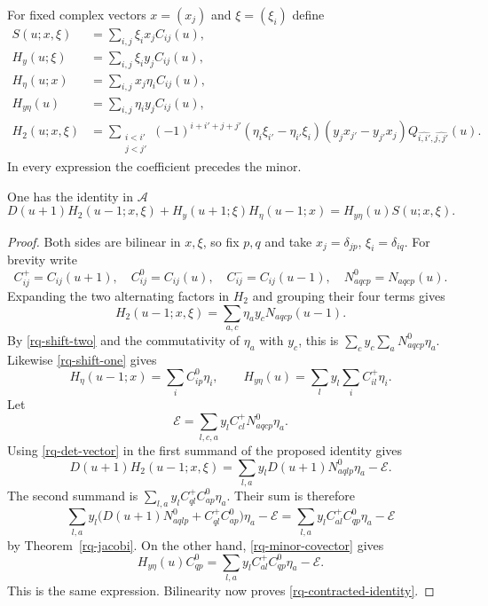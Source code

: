For fixed complex vectors $x=(x_j)$ and
$\xi=(\xi_i)$ define
\begin{align*}
 S(u;x,\xi)&=\sum_{i,j}\xi_i x_j C_{ij}(u),\\
 H_y(u;\xi)&=\sum_{i,j}\xi_i y_j C_{ij}(u),\\
 H_\eta(u;x)&=\sum_{i,j}x_j\eta_i C_{ij}(u),\\
 H_{y\eta}(u)&=\sum_{i,j}\eta_i y_j C_{ij}(u),\\
 H_2(u;x,\xi)&=
 \sum_{\substack{i<i'\\j<j'}}(-1)^{i+i'+j+j'}
  (\eta_i\xi_{i'}-\eta_{i'}\xi_i)
  (y_jx_{j'}-y_{j'}x_j)
            Q_{\widehat{i,i'},\widehat{j,j'}}(u).
\end{align*}
In every expression the coefficient precedes the minor.

\begin{theorem}\label{rq-contracted}
One has the identity in $\mathcal A$
\begin{equation}\label{rq-contracted-identity}
 D(u+1)H_2(u-1;x,\xi)
     +H_y(u+1;\xi)H_\eta(u-1;x)
                    =H_{y\eta}(u)S(u;x,\xi).
\end{equation}
\end{theorem}

\begin{proof}
Both sides are bilinear in $x,\xi$, so fix $p,q$
and take $x_j=\delta_{jp}$, $\xi_i=\delta_{iq}$.
For brevity write
\[
 C^+_{ij}=C_{ij}(u+1),\quad
 C^0_{ij}=C_{ij}(u),\quad C^-_{ij}=C_{ij}(u-1),
 \quad N^0_{aqcp}=N_{aqcp}(u).
\]
Expanding the two alternating factors in $H_2$
and grouping their four terms gives
\[
 H_2(u-1;x,\xi)=\sum_{a,c}\eta_a y_cN_{aqcp}(u-1).
\]
By \eqref{rq-shift-two} and the commutativity of
$\eta_a$ with $y_c$, this is
$\sum_c y_c\sum_aN^0_{aqcp}\eta_a$.
Likewise \eqref{rq-shift-one} gives
\[
 H_\eta(u-1;x)=\sum_iC^0_{ip}\eta_i,\qquad
 H_{y\eta}(u)=\sum_l y_l\sum_i C^+_{il}\eta_i.
\]
Let
\[
                  \mathcal E=
       \sum_{l,c,a}y_l C^+_{cl}N^0_{aqcp}\eta_a .
\]
Using \eqref{rq-det-vector} in the first summand
of the proposed identity gives
\[
 D(u+1)H_2(u-1;x,\xi)
       =\sum_{l,a}y_lD(u+1)N^0_{aqlp}\eta_a-\mathcal E.
\]
The second summand is
$\sum_{l,a}y_l C^+_{ql}C^0_{ap}\eta_a$.
Their sum is therefore
\[
 \sum_{l,a}y_l
   \bigl(D(u+1)N^0_{aqlp}+C^+_{ql}C^0_{ap}\bigr)\eta_a
                       -\mathcal E
   =\sum_{l,a}y_l C^+_{al}C^0_{qp}\eta_a-\mathcal E
\]
by Theorem~\ref{rq-jacobi}.
On the other hand,
\eqref{rq-minor-covector} gives
\[
 H_{y\eta}(u)C^0_{qp}
       =\sum_{l,a}y_l C^+_{al}C^0_{qp}\eta_a-\mathcal E.
\]
This is the same expression.  Bilinearity now proves
\eqref{rq-contracted-identity}.
\end{proof}

